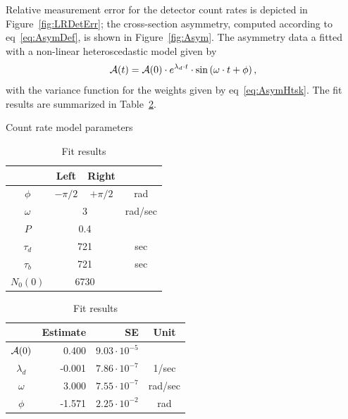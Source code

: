 \documentclass{article}
\newcommand{\vp}[2]{{#1}\cdot 10^{#2}}
\newcommand{\LTb}{\tau_b}
\newcommand{\LTd}{\tau_d}
\newcommand{\lamd}{\lambda_d}
\begin{document}
Relative measurement error for the detector count rates is depicted in Figure~\ref{fig:LRDetErr}; the cross-section asymmetry, computed according to eq~\eqref{eq:AsymDef}, is shown in Figure~\ref{fig:Asym}.
The asymmetry data a fitted with a non-linear heteroscedastic model given by
\[
\Asym(t) = \Asym(0)\cdot e^{\lamd\cdot t}\cdot\sin\bkt{\omega\cdot t + \phi},
\]
with the variance function for the weights given by eq~\eqref{eq:AsymHtsk}. The fit results are summarized in Table~\ref{tbl:FitRes}.
\begin{table}[h]
  \begin{minipage}[t]{.5\linewidth}
    \centering
    \caption{Count rate model parameters\label{tbl:DetCntRtParam}}
    \begin{tabular}[t]{cccc}
      \hline
      &   Left   &     Right     &  \\ \hline
      $\phi$  & $-\pi/2$ &   $+\pi/2$    &   rad   \\
      $\omega$ &  \multicolumn{2}{c}{3}   & rad/sec \\
      $P$    & \multicolumn{2}{c}{0.4}  &  \\
      $\LTd$  & \multicolumn{2}{c}{721}  &   sec   \\
      $\LTb$  & \multicolumn{2}{c}{721}  &   sec   \\
      $N_0(0)$ & \multicolumn{2}{c}{6730} &  \\ \hline
    \end{tabular}
  \end{minipage}%
  \begin{minipage}[t]{.5\linewidth}
    \centering
    \caption{Fit results\label{tbl:FitRes}}
    \begin{tabular}[t]{crrc}
      \hline
      & Estimate &             SE &  Unit   \\ \hline
      $\mathcal{A}(0)$ &   0.400 & $\vp{9.03}{-5}$ &         \\
      $\lamd$   &  -0.001 & $\vp{7.86}{-7}$ &  1/sec  \\
      $\omega$  &   3.000 & $\vp{7.55}{-7}$ & rad/sec \\
      $\phi$   &  -1.571 & $\vp{2.25}{-2}$ &   rad   \\ \hline
    \end{tabular}
  \end{minipage}
\end{table}
\end{document}

